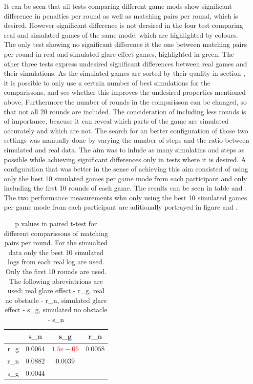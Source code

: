 It can be seen that all tests comparing different game mods show significant difference in penalties per round as well as matching pairs per round, which is desired. However significant difference is not dersired in the four test comparing real and simulated games of the same mode, which are highlighted by colours. The only test showing no significant difference it the one between matching pairs per round in real and simulated glare effect games, highlighted in green. The other three tests express undesired significant differences between real games and their simulations. As the simulated games are sorted by their quality in section , it is possible to only use a certain number of best simulations for the comparissons, and see whether this improves the undesired properties mentioned above. Furthermore the number of rounds in the comparisson can be changed, so that not all 20 rounds are included. The concideration of including less rounds is of importance, beacuse it can reveal which parts of the game are simulated accurately and which are not. The search for an better configuration of those two settings was manually done by varying the number of steps and the ratio between simulated and real data. The aim was to inlude as many simulatins and steps as possible while achieving significant differences only in tests where it is desired. A configuration that was better in the sense of achieving this aim consisted of using only the best 10 simulated games per game mode from each participant and only including the first 10 rounds of each game. The results can be seen in table  and . The two performance measurements whn only using the best 10 simulated games per game mode from each participant are aditionally portrayed in figure  and .

\begin{table}[H]
	\centering
	\caption{p values in paired t-test for different comparissons of matching pairs per round. For the simualted data only the best 10 simulated logs from each real log are used. Only the first 10 rounds are used. The following abreviatrions are used: real glare effect - r\_g, real no obstacle - r\_n, simulated glare effect - s\_g, simulated no obstacle - s\_n}%
	\begin{tabular}{|c|c|c|c|}
		\hline
				& s\_n    &  s\_g  & r\_n 		\\
		\hline
		r\_g 	&$0.0064$&\textcolor{red}{$1.5e-05$}&$0.0058$			\\
		r\_n 	&\textcolor{mygreen}{$0.0882$}&$0.0039$&		  			\\
		s\_g 	&$0.0044$&		  &		  			\\
		\hline
	\end{tabular}
\end{table}

